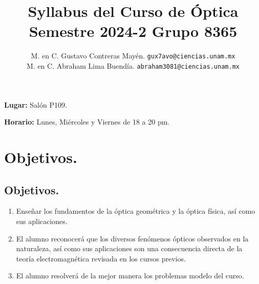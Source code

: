 
\usepackage[sfdefault]{roboto}  %
\usepackage[T1]{fontenc}

\author{M. en C. Gustavo Contreras Mayén. \texttt{gux7avo@ciencias.unam.mx}\\
M. en C. Abraham Lima Buendía. \texttt{abraham3081@ciencias.unam.mx}}
\title{\vspace*{-4cm}Syllabus del Curso de Óptica \\ {\large Semestre 2024-2 Grupo 8365}}
\date{ }


\usepackage[backend=biber, style=ieee, sorting=ynt]{biblatex}
% 




\renewcommand*{\theenumi}{\thesection.\arabic{enumi}}
\renewcommand*{\theenumii}{\theenumi.\arabic{enumii}}

\maketitle
\fontsize{12}{12}\selectfont

\textbf{Lugar:} Salón P109.
\par
\textbf{Horario:} Lunes, Miércoles y Viernes de 18 a 20 pm.

\section{Objetivos.}

\subsection{Objetivos.}

\begin{enumerate}
\item Enseñar los fundamentos de la óptica geométrica y la óptica física, así como sus aplicaciones.
\item El alumno reconocerá que los diversos fenómenos ópticos observados en la naturaleza, así como sus aplicaciones son una consecuencia directa de la teoría electromagnética revisada en los cursos previos.
\item El alumno resolverá de la mejor manera los problemas modelo del curso.
\end{enumerate}

